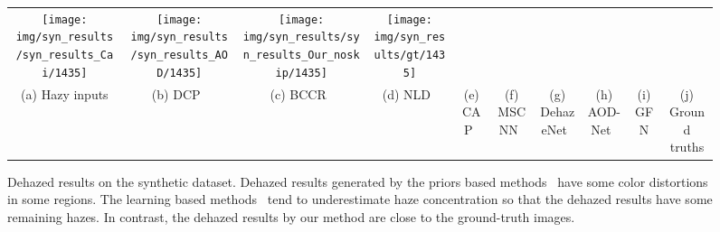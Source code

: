 \documentclass[10pt,twocolumn,letterpaper]{article}
\begin{document}
\begin{figure*}[t]
\begin{center}
\begin{tabular}{@{}cccccccccc@{}}
			\texttt{[image: img/syn\_results/syn\_results\_Cai/1435]} & \hspace{-0.4cm}
			\texttt{[image: img/syn\_results/syn\_results\_AOD/1435]} & \hspace{-0.4cm}
			\texttt{[image: img/syn\_results/syn\_results\_Our\_noskip/1435]} & \hspace{-0.4cm}
			\texttt{[image: img/syn\_results/gt/1435]}\\
			(a) Hazy inputs & \hspace{-0.4cm}
			(b) DCP~ & \hspace{-0.4cm}
			(c) BCCR~  & \hspace{-0.4cm}
			(d) NLD~  & \hspace{-0.4cm}
			(e) CAP~ & \hspace{-0.4cm}
			(f) MSCNN~  & \hspace{-0.4cm}
			(g) DehazeNet~  & \hspace{-0.4cm}
			(h) AOD-Net~  & \hspace{-0.4cm}
			(i) GFN & \hspace{-0.4cm}
			(j) Ground truths
		\end{tabular}
	\end{center}
	\vspace{-0.3cm}
	\caption{Dehazed results on the synthetic dataset. Dehazed results generated by the priors based methods~\cite{he2011single,meng2013efficient,berman2016non} have some color distortions in some regions. The learning based methods~\cite{zhu2015fast,ren2016single,cai2016dehazenet,li2017aod} tend to underestimate haze concentration so that the dehazed results have some remaining hazes. In contrast, the dehazed results by our method are close to the ground-truth images.
	}
	\label{fig-syn-results}
	\vspace{-0.1cm}
\end{figure*}
\end{document}
